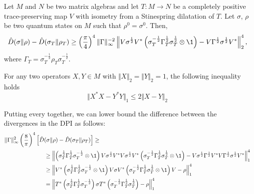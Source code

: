 \begin{theorem}\label{theo:LowerBoundDivergence2norm}
    Let $M$ and $N$ be two matrix algebras and let $T:M \to N$ be a completely positive trace-preserving map $V$ with isometry from a Stinespring dilatation of $T$.  Let $\sigma$, $\rho$ be two quantum states on $M$ such that $\rho^0=\sigma^0$. Then,
    \begin{equation}
        \hat{D}(\sigma\Vert \rho)-\hat{D}(\sigma_T \Vert \rho_T)\geq \left(\frac{\pi}{4}\right)^4 \Vert \Gamma  \Vert_{\infty}^{-2}\left\Vert V\sigma^{\frac{1}{2}}V^*\left(\sigma_T^{-\frac{1}{2}}\Gamma_T^{\frac{1}{2}}\sigma_T^{\frac{1}{2}}\otimes \1\right)-V\Gamma^{\frac{1}{2}}\sigma^{\frac{1}{2}}V^*\right\Vert_2^4,
    \end{equation}
    where $\Gamma_T=\sigma_T^{-\frac{1}{2}}\rho_T\sigma_T^{-\frac{1}{2}}$.
\end{theorem}
\begin{lemma}\label{lemma:LowerBoundNorm1withNorm2}
    For any two operators $X,Y \in M$ with $\Vert X \Vert_2=\Vert Y \Vert_2=1$, the following inequality holds
    \begin{equation}
        \Vert X^*X-Y^*Y\Vert_1 \leq 2 \Vert X-Y \Vert_2
    \end{equation}
\end{lemma}
Putting every together, we can lower bound the difference between the divergences in the DPI as follows:
\begin{equation}
\begin{split}
         \Vert \Gamma  \Vert_{\infty}^{2}\left(\frac{8}{\pi}\right)^4\left[\hat{D}(\sigma\Vert \rho)-\hat{D}(\sigma_T \Vert \rho_T)\right]&\geq \\  & \hspace{-3cm}\geq  \left\Vert \left(\sigma_T^{\frac{1}{2}}\Gamma_T^{\frac{1}{2}}\sigma_T^{-\frac{1}{2}}\otimes \1\right)V\sigma^{\frac{1}{2}}V^*V\sigma^{\frac{1}{2}}V^*\left(\sigma_T^{-\frac{1}{2}}\Gamma_T^{\frac{1}{2}}\sigma_T^{\frac{1}{2}}\otimes \1\right)-V\sigma^{\frac{1}{2}}\Gamma^{\frac{1}{2}}V^*V \Gamma^{\frac{1}{2}}\sigma^{\frac{1}{2}} V^*  \right\Vert_1^4\\
         & \hspace{-3cm}\geq   \left\Vert   V^* \left(\sigma_T^{\frac{1}{2}}\Gamma_T^{\frac{1}{2}}\sigma_T^{-\frac{1}{2}}\otimes \1\right)V \sigma V^*\left(\sigma_T^{-\frac{1}{2}}\Gamma_T^{\frac{1}{2}}\sigma_T^{\frac{1}{2}}\otimes \1\right)V- \rho \right\Vert_1^4\\
         &\hspace{-3cm} = \left\Vert T^*\left(\sigma_T^{\frac{1}{2}}\Gamma_T^{\frac{1}{2}}\sigma_T^{-\frac{1}{2}}  \right)\sigma T^*\left(\sigma_T^{-\frac{1}{2}}\Gamma_T^{\frac{1}{2}}\sigma_T^{\frac{1}{2}}  \right) -\rho \right\Vert_1^4   
    \end{split}
    \end{equation}
